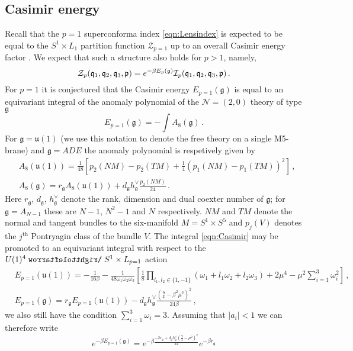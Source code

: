 \documentclass[main.tex]{subfiles}
\begin{document}
\subsection{Casimir energy}
Recall that the $p=1$ superconforma index \eqref{eqn:Lensindex} is expected to be equal to the $S^1\times L_1$ partition function $\mathcal{Z}_{p=1}$ up to an overall Casimir energy factor \cite{Benini:2011nc,Bobev:2015kza,Kim:2012qf,Kim:2012ava}. We expect that such a structure also holds for $p>1$, namely,
\begin{equation}
\mathcal{Z}_p(\mathfrak{q}_1,\mathfrak{q}_2,\mathfrak{q}_3,\mathfrak{p})=e^{-\beta E_p(\mathfrak{g})}\mathcal{I}_p(\mathfrak{q}_1,\mathfrak{q}_2,\mathfrak{q}_3,\mathfrak{p})\,.
\end{equation}
For $p=1$ it is conjectured that the Casimir energy $E_{p=1}(\mathfrak{g})$ is equal to an equivariant integral of the anomaly polynomial of the $\mathcal{N}=(2,0)$ theory of type $\mathfrak{g}$ \cite{Bobev:2015kza}
\begin{equation}\label{eqn:Casimir}
E_{p=1}(\mathfrak{g})=-\int A_8(\mathfrak{g})\,.
\end{equation}
For $\mathfrak{g}=\mathfrak{u}(1)$ (we use this notation to denote the free theory on a single M5-brane) and $\mathfrak{g}=ADE$ the anomaly polynomial is respetively given by \cite{Yi:2001bz,Intriligator:2000eq,Harvey:1998bx}
\begin{align}
&A_8(\mathfrak{u}(1))=\frac{1}{48}\left[p_2(NM)-p_2(TM)+\frac{1}{4}(p_1(NM)-p_1(TM))^2\right]\,,\\
&A_8(\mathfrak{g})=r_{\mathfrak{g}}A_8(\mathfrak{u}(1))+d_{\mathfrak{g}}h_{\mathfrak{g}}^{\vee}\frac{p_2(NM)}{24}\,.
\end{align}
Here $r_{\mathfrak{g}}$, $d_{\mathfrak{g}}$, $h_{\mathfrak{g}}^{\vee}$ denote the rank, dimension and dual coexter number of $\mathfrak{g}$; for $\mathfrak{g}=A_{N-1}$ these are $N-1$, $N^2-1$ and $N$ respectively. $NM$ and $TM$ denote the normal and tangent bundles to the six-manifold $M=S^1\times S^5$ and $p_j(V)$ denotes the $j^{\text{th}}$ Pontryagin class of the bundle $V$. The integral \eqref{eqn:Casimir} may be promoted to an equivariant integral with respect to the $U(1)^4\acts S^1\times L_{p=1}$ action \cite{Bobev:2015kza}
\begin{align}
&E_{p=1}(\mathfrak{u}(1))=-\frac{1}{16\beta}-\frac{1}{48\omega_1\omega_2\omega_3}\left[
   \frac{1}{8}\prod_{l_1,l_2\in\{1,-1\}}\left(\omega_1+l_1\omega_2+l_2\omega_3\right) +2\mu^4- 
  \mu^2 \sum_{i=1}^3\omega_i^2\right]\,,\\
&E_{p=1}(\mathfrak{g})=r_{\mathfrak{g}}E_{p=1}(\mathfrak{u}(1))-d_{\mathfrak{g}}h_{\mathfrak{g}}^{\vee}\frac{\left(\frac{9}{4}-\beta^2\mu^2\right)^2}{24\beta}\,,
\end{align}
we also still have the condition $\sum_{i=1}^3\omega_i=3$.
Assuming that $|a_i|<1$ we can therefore write
\begin{equation}
e^{-\beta E_{p=1}(\mathfrak{g})}=e^{-\beta\frac{-2r_{\mathfrak{g}}+d_{\mathfrak{g}}h^{\vee}_{\mathfrak{g}}\left(\frac{9}{4}-\mu^2\right)^2}{24}}e^{-\beta r_{\mathfrak{g}}}
\end{equation}
\end{document}
